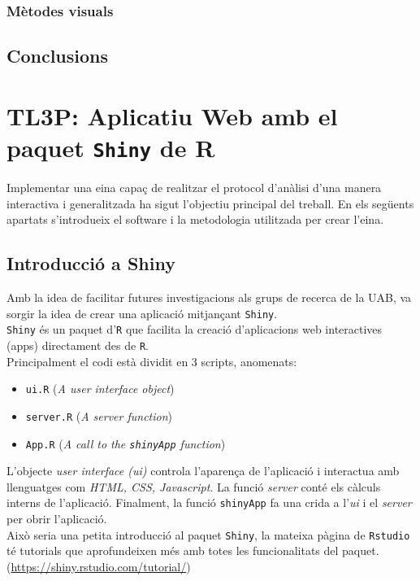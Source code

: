 \documentclass[english]{article}
\begin{document}
\subsubsection{Mètodes visuals}
\subsection{Conclusions}
\twocolumn
\section{TL3P: Aplicatiu Web amb el paquet \texttt{Shiny} de R}
Implementar una eina capa\c{c} de realitzar el protocol d'anàlisi d'una manera interactiva i generalitzada ha sigut l'objectiu principal del treball. En els següents apartats s'introdueix el software i la metodologia utilitzada per crear l'eina.
\subsection{Introducció a Shiny}
Amb la idea de facilitar futures investigacions als grups de recerca de la UAB, va sorgir la idea de crear una aplicació mitjan\c{c}ant \texttt{Shiny}.
\\

\texttt{Shiny} és un paquet d'\texttt{R} que facilita la creació d'aplicacions web interactives (apps) directament des de \texttt{R}.
\\

Principalment el codi està dividit en 3 scripts, anomenats:
\begin{itemize}
\item \texttt{ui.R} (\textit{A user interface object})
\item \texttt{server.R} (\textit{A server function})
\item \texttt{App.R} (\textit{A call to the \texttt{shinyApp} function})
\end{itemize}
L'objecte \textit{user interface (ui)} controla l'aparen\c{c}a de l'aplicació i interactua amb llenguatges com \textit{HTML, CSS, Javascript}. La funció \textit{server} conté els càlculs interns de l'aplicació. Finalment, la funció \texttt{shinyApp} fa una crida a l'\textit{ui} i el \textit{server} per obrir l'aplicació.
\\

Això seria una petita introducció al paquet \texttt{Shiny}, la mateixa pàgina de \texttt{Rstudio} té tutorials que aprofundeixen més amb totes les funcionalitats del paquet. (\url{https://shiny.rstudio.com/tutorial/})
\end{document}
